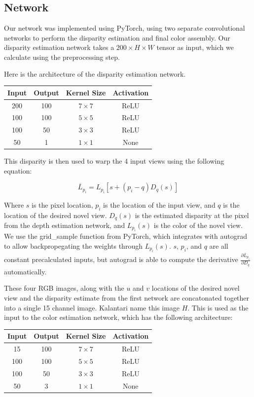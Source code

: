 \documentclass[10pt,twocolumn,letterpaper]{article}
\begin{document}
\subsection{Network}

Our network was implemented using PyTorch, using two separate convolutional networks to perform the
disparity estimation and final color assembly. Our disparity estimation network takes a 
$200 \times H \times W$ tensor as input, which we calculate using the preprocessing step.

Here is the architecture of the disparity estimation network.

\begin{center}
\begin{tabular}{|c c c c|}
    Input & Output & Kernel Size & Activation \\
    \hline
    200 & 100 & $7 \times 7$ & ReLU \\
    100 & 100 & $5 \times 5$ & ReLU \\
    100 & 50 & $3 \times 3$ & ReLU \\
    50 & 1 & $1 \times 1$ & None \\
\end{tabular}
\end{center}


This disparity is then used to warp the 4 input views using the following equation:

$$
\overline{L}_{p_i} = L_{p_i} \left[ s + \left(p_i - q\right) D_q(s) \right]
$$

Where $s$ is the pixel location, $p_i$ is the location of the input view, and $q$ is the location of the
desired novel view. $D_q(s)$ is the estimated disparity at the pixel from the depth estimation network,
and $L_{p_i}(s)$ is the color of the novel view. We use the grid\_sample function from PyTorch, which integrates
with autograd to allow backpropegating the weights through $L_{p_i}(s)$. $s$, $p_i$, and $q$ are all 
constant precalculated inputs, but autograd is able to compute the derivative 
$\frac{\partial \overline{L}_{p_i}}{\partial D_q}$ automatically. 

These four RGB images, along with the $u$ and $v$ 
locations of the desired novel view and the disparity estimate from the first network are concatonated
together into a single 15 channel image. Kalantari \etal name this image $H$. This is used as the input to the color estimation network, which
has the following architecture:

\begin{center}
\begin{tabular}{|c c c c|}
    Input & Output & Kernel Size & Activation \\
    \hline
    15 & 100 & $7 \times 7$ & ReLU \\
    100 & 100 & $5 \times 5$ & ReLU \\
    100 & 50 & $3 \times 3$ & ReLU \\
    50 & 3 & $1 \times 1$ & None \\
\end{tabular}
\end{center}
\end{document}
